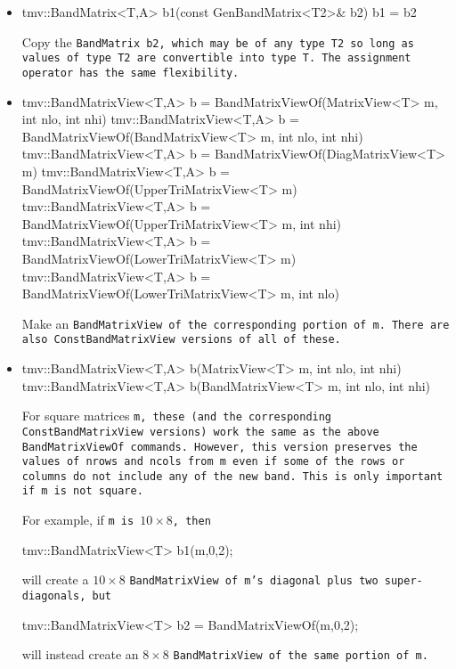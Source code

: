 \begin{itemize}
\item
\begin{tmvcode}
tmv::BandMatrix<T,A> b1(const GenBandMatrix<T2>& b2)
b1 = b2
\end{tmvcode}
Copy the \tt{BandMatrix b2}, which may be of any type \tt{T2} so long
as values of type \tt{T2} are convertible into type \tt{T}.
The assignment operator has the same flexibility.

\item
\begin{tmvcode}
tmv::BandMatrixView<T,A> b = 
      BandMatrixViewOf(MatrixView<T> m, int nlo, int nhi)
tmv::BandMatrixView<T,A> b = 
      BandMatrixViewOf(BandMatrixView<T> m, int nlo, int nhi)
tmv::BandMatrixView<T,A> b = 
      BandMatrixViewOf(DiagMatrixView<T> m)
tmv::BandMatrixView<T,A> b = 
      BandMatrixViewOf(UpperTriMatrixView<T> m)
tmv::BandMatrixView<T,A> b = 
      BandMatrixViewOf(UpperTriMatrixView<T> m, int nhi)
tmv::BandMatrixView<T,A> b = 
      BandMatrixViewOf(LowerTriMatrixView<T> m)
tmv::BandMatrixView<T,A> b = 
      BandMatrixViewOf(LowerTriMatrixView<T> m, int nlo)
\end{tmvcode}
Make an \tt{BandMatrixView} of the corresponding portion of \tt{m}.  
There are also \tt{ConstBandMatrixView} versions of all of these.  

\item
\begin{tmvcode}
tmv::BandMatrixView<T,A> b(MatrixView<T> m, int nlo, int nhi)
tmv::BandMatrixView<T,A> b(BandMatrixView<T> m, int nlo, int nhi)
\end{tmvcode}
For square matrices \tt{m}, these (and the corresponding \tt{ConstBandMatrixView}
versions) work the same as the above \tt{BandMatrixViewOf}
commands.  However, this version preserves the values of \tt{nrows} and \tt{ncols}
from \tt{m}
even if some of the rows or columns do not include any of the new band.
This is only important if \tt{m} is not square.

For example, if \tt{m} is $10 \times 8$, then 
\begin{tmvcode}
tmv::BandMatrixView<T> b1(m,0,2);
\end{tmvcode}
will create a $10 \times 8$ \tt{BandMatrixView} of \tt{m}'s diagonal plus two super-diagonals, but
\begin{tmvcode}
tmv::BandMatrixView<T> b2 = BandMatrixViewOf(m,0,2);
\end{tmvcode}
will instead create an $8 \times 8$ \tt{BandMatrixView} of the same portion of \tt{m}.


\end{itemize}
